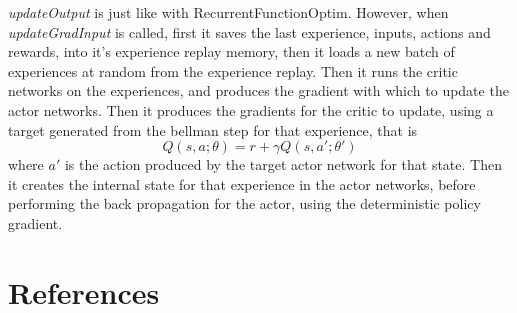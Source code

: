 \emph{updateOutput} is just like with RecurrentFunctionOptim. However, when \emph{updateGradInput} is called, first it saves the last experience, inputs, actions and rewards, into it's experience replay memory, then it loads a new batch of experiences at random from the experience replay. Then it runs the critic networks on the experiences, and produces the gradient with which to update the actor networks. Then it produces the gradients for the critic to update, using a target generated from the bellman step for that experience, that is \begin{equation}
Q(s,a;\theta) = r + \gamma Q(s,a';\theta')
\end{equation} where $a'$ is the action produced by the target actor network for that state. Then it creates the internal state for that experience in the actor networks, before performing the back propagation for the actor, using the deterministic policy gradient.



\section{References}
\printbibliography[omitnumbers = false]